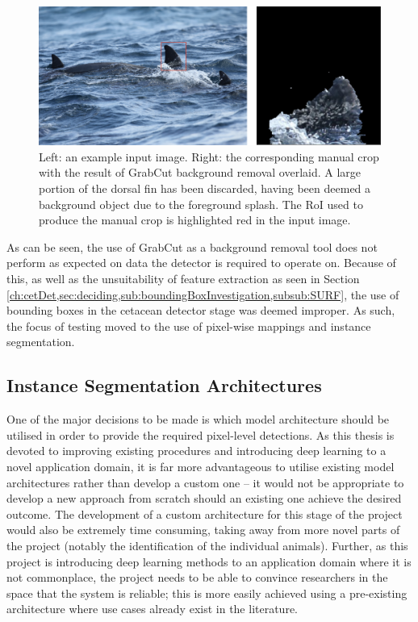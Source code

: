 \begin{figure}
	\begin{center}
		\includegraphics[scale=0.6]{Chapter3/figs/grabcut-example-updated.png}
	\end{center}
	\caption[Left: an example input image. Right: the corresponding manual crop with the result of GrabCut background removal overlaid.]{Left: an example input image. Right: the corresponding manual crop with the result of GrabCut background removal overlaid. A large portion of the dorsal fin has been discarded, having been deemed a background object due to the foreground splash. The RoI used to produce the manual crop is highlighted red in the input image.
	}
	\label{fig:grabcut-example}
\end{figure}

As can be seen, the use of GrabCut as a background removal tool does not perform as expected on data the detector is required to operate on. Because of this, as well as the unsuitability of feature extraction as seen in Section \ref{ch:cetDet,sec:deciding,sub:boundingBoxInvestigation,subsub:SURF}, the use of bounding boxes in the cetacean detector stage was deemed improper. As such, the focus of testing moved to the use of pixel-wise mappings and instance segmentation.  

\subsection{Instance Segmentation Architectures}\label{ch:cetDet,sec:deciding,sub:instanceSegArchitectures}

One of the major decisions to be made is which model architecture should be utilised in order to provide the required pixel-level detections. As this thesis is devoted to improving existing procedures and introducing deep learning to a novel application domain, it is far more advantageous to utilise existing model architectures rather than develop a custom one -- it would not be appropriate to develop a new approach from scratch should an existing one achieve the desired outcome. The development of a custom architecture for this stage of the project would also be extremely time consuming, taking away from more novel parts of the project (notably the identification of the individual animals). Further, as this project is introducing deep learning methods to an application domain where it is not commonplace, the project needs to be able to convince researchers in the space that the system is reliable; this is more easily achieved using a pre-existing architecture where use cases already exist in the literature. 

